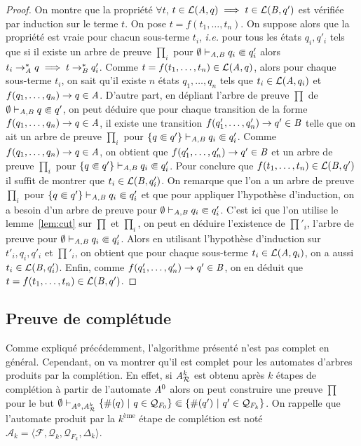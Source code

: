 \begin{proof}
  On montre que la propriété $\forall t$, $t \in \mathcal{L}(\mathit A, q) \; \Longrightarrow \; t \in \mathcal{L}(\mathit B, q')$ est vérifiée par
  induction sur le terme $t$. On pose $t = f(t_1, \dots, t_n)$. 
  On suppose alors que la propriété est vraie pour chacun sous-terme 
  $t_i$, \textit{i.e.} pour tous les états  $q_i, q'_i$ tels que si il existe un arbre de
  preuve $\prod_i$ pour $\emptyset \vdash_{\mathit A, \mathit B} q_i \Subset q'_i$ alors $t_i
  \rightarrow^*_{\mathit A} q \; \Longrightarrow \; t \rightarrow^*_{\mathit B} q_i'$. Comme $t=f(t_1, \dots,
  t_n) \in \mathcal{L}(\mathit A, q)$, alors pour chaque sous-terme $t_i$, on sait qu'il existe $n$ états 
  $q_1, \ldots, q_n$ tels que $t_i \in \mathcal{L}(\mathit A, q_i)$ et $f(q_1, \dots, q_n)
  \rightarrow q \in \mathit A$. D'autre part, en dépliant  l'arbre de preuve $\prod$ de
  $\emptyset \vdash_{\mathit A, \mathit B} q \Subset q'$, on peut déduire que pour chaque transition
  de la forme $f(q_1, \dots, q_n) \rightarrow q \in \mathit A$, il existe une transition $f(q'_1,
  \dots, q'_n) \rightarrow q' \in \mathit B$ telle que on ait un arbre de preuve $\prod_i$ pour
  $\{q \Subset q'\} \vdash_{\mathit A, \mathit B} q_i \Subset q'_i$. 
  Comme $f(q_1, \ldots, q_n) \rightarrow q \in \mathit A$, on obtient que $f(q'_1, \dots, q'_n)
  \rightarrow q' \in \mathit B$ et un arbre de preuve $\prod_i$ pour $\{q \Subset q'\} \vdash_{\mathit A,
    \mathit B} q_i \Subset q'_i$. Pour conclure que $f(t_1, \dots, t_n) \in \mathcal{L}(\mathit B,
  q')$ il suffit de montrer que  $t_i \in \mathcal{L}(\mathit B, q'_i)$. On remarque que l'on a 
  un arbre de preuve $\prod_i$ pour $\{q \Subset q'\} \vdash_{\mathit A,\mathit B} q_i \Subset q'_i$
  et que pour appliquer l'hypothèse d'induction, on a besoin d'un arbre de preuve pour
  $\emptyset \vdash_{\mathit A,\mathit B} q_i \Subset q'_i$. C'est ici que l'on utilise le lemme~\ref{lem:cut} sur $\prod$
  et $\prod_i$, on peut en déduire l'existence de $\prod'_i$, l'arbre de preuve pour
  $\emptyset \vdash_{\mathit A, \mathit B} q_i \Subset q'_i$. Alors en utilisant l'hypothèse d'induction sur
  $t'_i, q_i, q'_i$ et $\prod'_i$,
  on obtient que pour chaque sous-terme $t_i \in \mathcal{L}(\mathit A, q_i)$, on a aussi $t_i \in
  \mathcal{L}(\mathit B, q'_i)$. Enfin, comme $f(q'_1, \ldots, q'_n)\rightarrow q' \in \mathit B$, on en déduit que
  $t=f(t_1, \dots, t_n) \in \mathcal{L}(\mathit B, q')$.
\end{proof}



\subsection{Preuve de complétude}
\label{sec:completness}

Comme expliqué précédemment, l'algorithme présenté n'est pas complet en général.
Cependant, on va montrer qu'il est complet pour les automates d'arbres produits par
la complétion. En effet, si $\mathit A_\mathcal R^k$ est obtenu après  $k$
étapes de complétion à partir de l'automate $\mathit A^0$ alors on peut construire une preuve $\prod$ pour 
le but $\emptyset \vdash_{\mathit A^0, \mathit A^k_{\mathcal R}} \{\#(q)\ |\ q \in
\mathcal{Q}_{F_0}\} \Subset \{\#(q')\ |\ q'\in
\mathcal{Q}_{F_k}\}$. On rappelle que l'automate produit par la 
$k^\text{ème}$ étape de complétion est noté $\mathcal{A}_k = \langle
\mathcal{F}, \mathcal{Q}_k, \mathcal{Q}_{F_k}, \Delta_k\rangle$.

